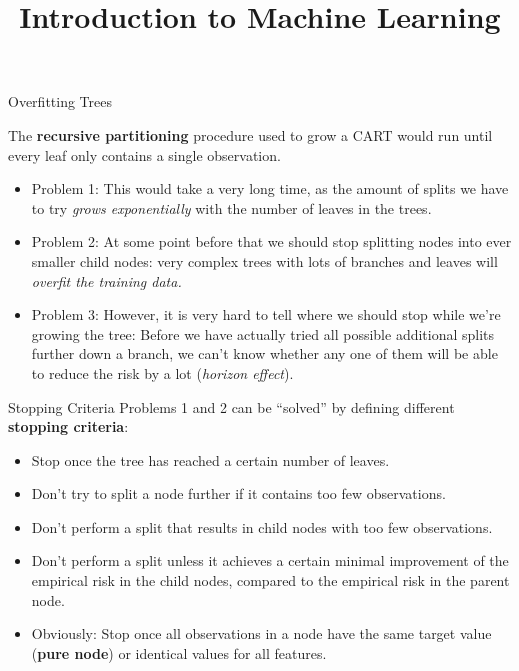 
\newcommand{\titlefigure}{figure/cart_stopprun_2.pdf}
\newcommand{\learninggoals}{
\item Understand which problems arise when growing the tree until the end
\item Know different stopping criteria
\item Understand the idea of pruning}

\title{Introduction to Machine Learning}
\date{}


\sloppy

\begin{frame}{Overfitting Trees}

The \textbf{recursive partitioning} procedure used to grow a CART would run until every leaf only contains a single observation. 
\begin{itemize}
\item Problem 1: This would take a very long time, as the amount of splits we have to try \emph{grows exponentially} with the number of leaves in the trees.
\item Problem 2: At some point before that we should stop splitting nodes into ever smaller child nodes: very complex trees with lots of branches and leaves will \emph{overfit the training data.}
\item Problem 3: However, it is very hard to tell where we should stop while we're growing the tree: Before we have actually tried all possible additional splits further down a branch, we can't know whether any one of them will be able to reduce the risk by a lot (\emph{horizon effect}).
\end{itemize}
\end{frame}

\begin{vbframe}{Stopping Criteria}
Problems 1 and 2 can be \enquote{solved} by defining different \textbf{stopping criteria}:
  \begin{itemize}
    \item Stop once the tree has reached a certain number of leaves.
    \item Don't try to split a node further if it contains too few observations.
    \item Don't perform a split that results in child nodes with too few observations.
    \item Don't perform a split unless it achieves a certain minimal improvement of the empirical risk in the child nodes, compared to the empirical risk in the parent node.
    \item Obviously: Stop once all observations in a node have the same target value (\textbf{pure node}) or identical values for all features. 
  \end{itemize}
\end{vbframe}


